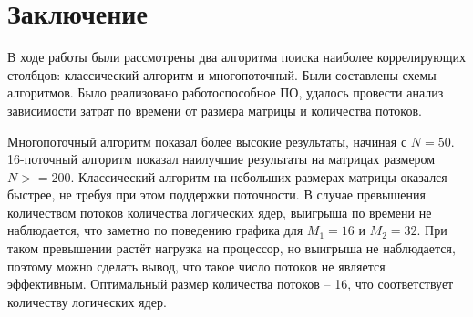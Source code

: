 \chapter{Заключение}
В ходе работы были рассмотрены два алгоритма поиска наиболее коррелирующих столбцов: классический алгоритм
и многопоточный.
Были составлены схемы алгоритмов.
Было реализовано работоспособное ПО, удалось провести анализ зависимости затрат по времени от размера матрицы и количества потоков.

Многопоточный алгоритм показал более высокие результаты, начиная с $N=50$.
16-поточный алгоритм показал наилучшие результаты на матрицах размером $N >= 200$. 
Классический алгоритм на небольших размерах матрицы оказался быстрее, не требуя при этом
поддержки поточности.
В случае превышения количеством потоков количества логических ядер,
выигрыша по времени не наблюдается, что заметно по поведению графика для $M_1 = 16$ и $M_2 = 32$.
При таком превышении растёт нагрузка на процессор, но выигрыша не наблюдается, поэтому можно сделать вывод,
что такое число потоков не является эффективным.
Оптимальный размер количества потоков -- 16, что соответствует количеству логических ядер.